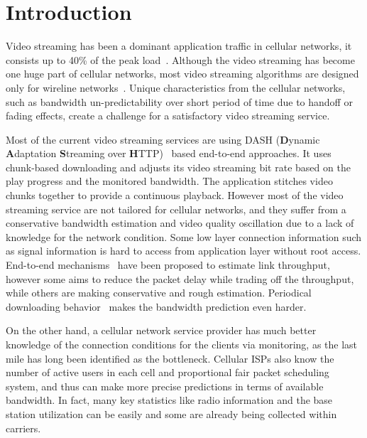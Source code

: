 \section{Introduction}
Video streaming has been a dominant application traffic in cellular networks, it consists
up to 40\% of the peak load~\cite{LTENetwork, VideoMeasureatt}. Although
the video streaming has become one huge part of cellular networks, most video streaming algorithms are designed only for wireline networks~\cite{BBA, QDASH, Festive}. Unique characteristics from the cellular networks, such as bandwidth un-predictability over short period of
time due to handoff or fading effects, create a challenge for a satisfactory
video streaming service. 

Most of the current video streaming services are using DASH (\textbf{D}ynamic
\textbf{A}daptation \textbf{S}treaming over \textbf{H}TTP)~\cite{DASH} based
end-to-end approaches. It uses chunk-based downloading and adjusts its video
streaming bit rate based on the play progress and the monitored bandwidth. The
application stitches video chunks together to provide a continuous playback.
However most of the video streaming service are not tailored for cellular networks, and they suffer from a conservative bandwidth estimation and video quality oscillation due to a lack of knowledge for the network condition. 
Some low layer connection information such as signal information is hard to access from application layer without root access.
End-to-end mechanisms~\cite{Sprout, QDASH, Festive} have been proposed to estimate link throughput, however some aims to reduce the packet delay while trading off the throughput, while others are making conservative and rough estimation. Periodical downloading behavior~\cite{OnOff} makes the bandwidth prediction even harder.

On the other hand, a cellular network service provider has much better knowledge of the connection
conditions for the clients via monitoring, as the last mile has long been identified as the
bottleneck\cite{LASTMILE}. Cellular ISPs also know the number of
active users in each cell and proportional fair packet scheduling system, and thus can make more
precise predictions in terms of available bandwidth. In fact, many key statistics like radio information and the base station utilization can be easily and some are
already being collected within carriers. 

